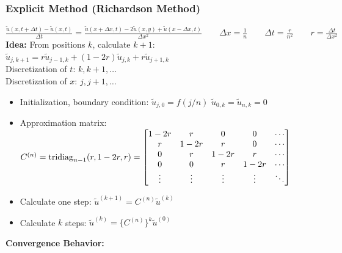 \newpage

\subsubsection{Explicit Method (Richardson Method)}
$\boxed{\frac{\tilde{u}(x,t+\Delta t) - \tilde{u}(x,t)}{\Delta t} =
\frac{\tilde{u}(x+\Delta x, t)-2\tilde{u}(x,y) + \tilde{u}( x - \Delta x, t )} {\Delta x^2}} \qquad \Delta x=\frac{1}{n} \qquad \Delta t=\frac{r}{n^2} \qquad \boxed{r=\frac{\Delta
t}{\Delta x^2}}$\\

\textbf{Idea:} From positions $k$, calculate $k+1$: $\tilde{u}_{j,k+1} = r \tilde{u}_{j-1,k} + (1-2r)\tilde{u}_{j,k} + r \tilde{u}_{j+1,k}$\\
Discretization of $t$: $k, k+1, \ldots$\\
Discretization of $x$: $j, j+1, \ldots$\\

\begin{itemize}
\item Initialization, boundary condition: $\tilde{u}_{j,0}=f(j/n)$ \qquad $\tilde{u}_{0,k}=\tilde{u}_{n,k}=0$
\item Approximation matrix: $C^{(n)}=\operatorname{tridiag}_{n-1}(r,1-2r,r)=\begin{bmatrix}
1-2r& r		& 0		& 0 	&\cdots\\
r	& 1-2r  & r		& 0		&\cdots\\
0	& r		& 1-2r 	& r 	&\cdots\\
0	& 0		& r		& 1-2r 	&\cdots\\
\vdots&	\vdots&\vdots&\vdots&\ddots
\end{bmatrix}$
\item Calculate one step: $\tilde{u}^{(k+1)}=C^{(n)} \tilde{u}^{(k)}$
\item Calculate $k$ steps: $\tilde{u}^{(k)}=\big\{C^{(n)}\big\}^k \tilde{u}^{(0)}$
\end{itemize}

\textbf{Convergence Behavior:} \\

